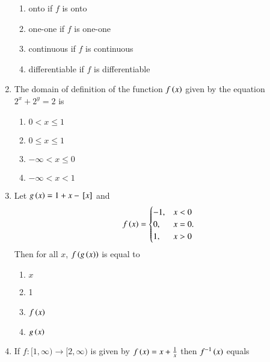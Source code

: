 \documentclass[journal,12pt,twocolumn]{IEEEtran}
\theoremstyle{remark}
\begin{document}
\begin{enumerate}
\hfill{}

\begin{enumerate}
\item onto if $f$ is onto
\item one-one if $f$ is one-one
\item continuous if $f$ is continuous
\item differentiable if $f$ is differentiable
\end{enumerate}

\item The domain of definition of the function $f\left(x\right)$ given by the equation $2^{x}+2^{y}=2$ is

\hfill{}

\begin{multicols}{2}
	\begin{enumerate}
		\item $0<x\le1$ 
		\item $0\le x\le1$
		\item $-\infty<x\le0$ 
		\item $-\infty<x<1$
	\end{enumerate}
\end{multicols}

\item Let $g\left(x\right)=1+x-{}\left[x\right]$ and
\begin{equation}
f\left(x\right)=
\begin{cases}
-1, & \text{$x<0$} \\
0, & \text{$x=0$.} \\
1, & \text{$x>0$}
\end{cases}
\end{equation}
Then for all $x$, $f\left(g\left(x\right)\right)$ is equal to

\hfill{}

\begin{multicols}{2}
	\begin{enumerate}
		\item $x$ 
		\item 1
		\item $f\left(x\right)$ 
		\item $g\left(x\right)$
	\end{enumerate}
\end{multicols}

\item If $f:[1,\infty)\to[2,\infty)$ is given by $f\left(x\right)=x+\frac{1}{x}$ then $f^{-1}\left(x\right)$ equals

\hfill{}


\end{enumerate}
\end{document}
